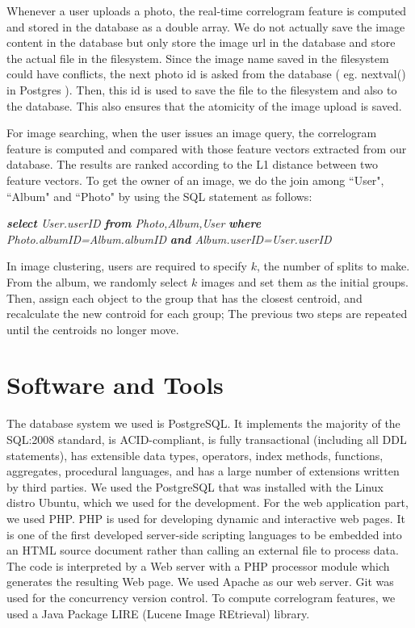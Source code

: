 \documentclass[10pt,twocolumn,letterpaper]{article}
\begin{document}
Whenever a user uploads a photo, the real-time correlogram feature is computed and stored in the database as a double array. We do not actually save the image content in the database but only store the image url in the database and store the actual file in the filesystem. Since the image name saved in the filesystem could have conflicts, the next photo id is asked from the database ( eg. nextval() in Postgres ). Then, this id is used to save the file to the filesystem and also to the database. This also ensures that the atomicity of the image upload is saved.

For image searching, when the user issues an image query, the correlogram feature is computed and compared with those feature vectors extracted from our database. The results are ranked according to the L1 distance between two feature vectors. To get the owner of an image, we do the join among ``User", ``Album" and ``Photo" by using the SQL statement as follows:

\emph{\textbf{select} User.userID}\newline \indent
\emph{\textbf{from} Photo,Album,User}\newline \indent
\emph{\textbf{where} Photo.albumID=Album.albumID}\newline \indent \indent \indent
\emph{\textbf{and} Album.userID=User.userID}

In image clustering, users are required to specify $k$, the number of splits to make. From the album, we randomly select $k$ images and set them as the initial groups. Then, assign each object to the group that has the closest centroid, and recalculate the new controid for each group; The previous two steps are repeated until the centroids no longer move.

\section{Software and Tools}
The database system we used is PostgreSQL\cite{postgres}. It implements the majority of the SQL:2008 standard, is ACID-compliant, is fully transactional (including all DDL statements), has extensible data types, operators, index methods, functions, aggregates, procedural languages, and has a large number of extensions written by third parties. We used the PostgreSQL that was installed with the Linux distro Ubuntu, which we used for the development. For the web application part, we used PHP\cite{php}. PHP is used for developing dynamic and interactive web pages. It is one of the first developed server-side scripting languages to be embedded into an HTML source document rather than calling an external file to process data. The code is interpreted by a Web server with a PHP processor module which generates the resulting Web page. We used Apache\cite{apache} as our web server. Git\cite{git} was used for the concurrency version control. To compute correlogram features, we used a Java Package LIRE (Lucene Image REtrieval) library.
\end{document}
